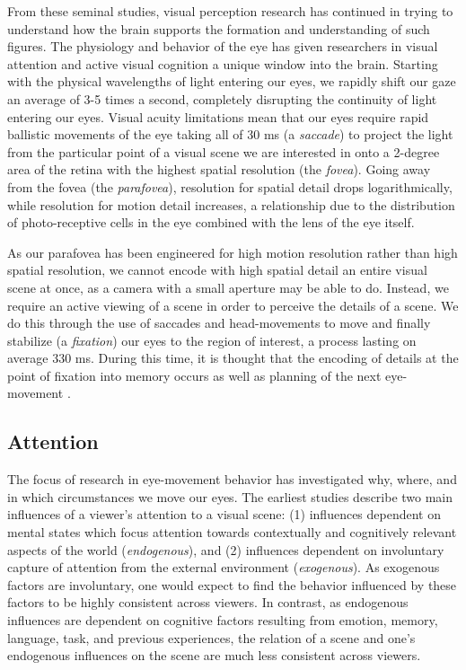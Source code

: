 \documentclass[a4paper,10pt,final]{ThesisStyle}
\begin{document}
From these seminal studies, visual perception research has continued in trying to understand how the brain supports the formation and understanding of such figures.  The physiology and behavior of the eye has given researchers in visual attention and active visual cognition a unique window into the brain.  Starting with the physical wavelengths of light entering our eyes, we rapidly shift our gaze an average of 3-5 times a second, completely disrupting the continuity of light entering our eyes.  Visual acuity limitations mean that our eyes require rapid ballistic movements of the eye taking all of 30 ms (a \textit{saccade}) to project the light from the particular point of a visual scene we are interested in onto a 2-degree area of the retina with the highest spatial resolution (the \textit{fovea}).  Going away from the fovea (the \textit{parafovea}), resolution for spatial detail drops logarithmically, while resolution for motion detail increases, a relationship due to the distribution of photo-receptive cells in the eye combined with the lens of the eye itself.  

As our parafovea has been engineered for high motion resolution rather than high spatial resolution, we cannot encode with high spatial detail an entire visual scene at once, as a camera with a small aperture may be able to do.  Instead, we require an active viewing of a scene in order to perceive the details of a scene.  We do this through the use of saccades and head-movements to move and finally stabilize (a \textit{fixation}) our eyes to the region of interest, a process lasting on average 330 ms.  During this time, it is thought that the encoding of details at the point of fixation into memory occurs as well as planning of the next eye-movement \cite{}.  

\subsection{Attention}

The focus of research in eye-movement behavior has investigated why, where, and in which circumstances we move our eyes.  The earliest studies \cite{Buswell1935,Yarbus1967} describe two main influences of a viewer's attention to a visual scene: (1) influences dependent on mental states which focus attention towards contextually and cognitively relevant aspects of the world (\textit{endogenous}), and (2) influences dependent on involuntary capture of attention from the external environment (\textit{exogenous}).  As exogenous factors are involuntary, one would expect to find the behavior influenced by these factors to be highly consistent across viewers.  In contrast, as endogenous influences are dependent on cognitive factors resulting from emotion, memory, language, task, and previous experiences, the relation of a scene and one's endogenous influences on the scene are much less consistent across viewers.  
\end{document}
